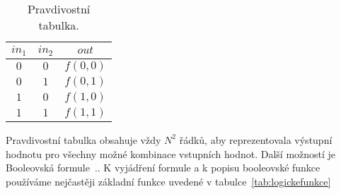 \documentclass{report}
\begin{document}
\begin{table}
\centering
\begin{tabular}{ |c c|c| } 
   	\hline
	$in_1$ & $in_2$ & $out$ \\
	\hline
	$0$ & $0$ & $f(0,0)$ \\
	$0$ & $1$ & $f(0,1)$ \\
	$1$ & $0$ & $f(1,0)$ \\
	$1$ & $1$ & $f(1,1)$ \\
   	\hline
\end{tabular}
    \caption{Pravdivostní tabulka.}
    \label{tab:andtable}
\end{table}
Pravdivostní tabulka obsahuje vždy $N^2$ řádků, aby reprezentovala výstupní hodnotu pro všechny možné kombinace vstupních hodnot. Další možností je Booleovská formule~.\cite{kubatova}. K vyjádření formule a k popisu booleovské funkce používáme nejčastěji základní funkce uvedené v tabulce~\ref{tab:logickefunkce}
\end{document}
